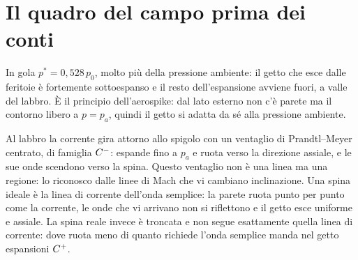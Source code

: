 
\section*{Il quadro del campo prima dei conti}
In gola $p^*=0{,}528\,p_0$, molto più della pressione ambiente: il getto che esce dalle feritoie è fortemente
sottoespanso e il resto dell'espansione avviene fuori, a valle del labbro. È il principio dell'aerospike: dal lato
esterno non c'è parete ma il contorno libero a $p=p_a$, quindi il getto si adatta da sé alla pressione ambiente.

Al labbro la corrente gira attorno allo spigolo con un ventaglio di Prandtl--Meyer centrato, di famiglia $C^{-}$: espande
fino a $p_a$ e ruota verso la direzione assiale, e le sue onde scendono verso la spina. Questo ventaglio non è una linea
ma una regione: lo riconosco dalle linee di Mach che vi cambiano inclinazione. Una spina ideale è la linea di corrente
dell'onda semplice: la parete ruota punto per punto come la corrente, le onde che vi arrivano non si riflettono e il
getto esce uniforme e assiale. La spina reale invece è troncata e non segue esattamente quella linea di corrente: dove
ruota meno di quanto richiede l'onda semplice manda nel getto espansioni $C^{+}$.

